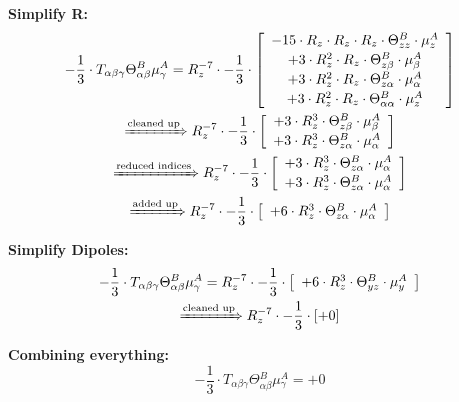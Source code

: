 \documentclass{article}
\begin{document}
\textbf{Simplify R:}
\begin{subequations}\begin{gather}
- \frac{1}{3} \cdot T_{\alpha{}\beta{}\gamma{}} \Theta{}^{B}_{\alpha{}\beta{}} \mu{}^{A}_{\gamma{}} = R_{z}^{-7} \cdot - \frac{1}{3} \cdot  \left[ \begin{array}{c} 
 		- 15 \cdot R_{z} \cdot R_{z} \cdot R_{z} \cdot \Theta{}^{B}_{zz} \cdot \mu{}^{A}_{z} 
 \\[0.2em] 		 + 3 \cdot R_{z}^{2} \cdot R_{z} \cdot \Theta{}^{B}_{z\beta{}} \cdot \mu{}^{A}_{\beta{}} 
 \\[0.2em] 		 + 3 \cdot R_{z}^{2} \cdot R_{z} \cdot \Theta{}^{B}_{z\alpha{}} \cdot \mu{}^{A}_{\alpha{}} 
 \\[0.2em] 		 + 3 \cdot R_{z}^{2} \cdot R_{z} \cdot \Theta{}^{B}_{\alpha{}\alpha{}} \cdot \mu{}^{A}_{z}
 \end{array}\right] 
\\ \xRightarrow{\text{cleaned up}}
 R_{z}^{-7} \cdot - \frac{1}{3} \cdot  \left[ \begin{array}{c} 
 		+ 3 \cdot R_{z}^{3} \cdot \Theta{}^{B}_{z\beta{}} \cdot \mu{}^{A}_{\beta{}} 
 \\[0.2em] 		 + 3 \cdot R_{z}^{3} \cdot \Theta{}^{B}_{z\alpha{}} \cdot \mu{}^{A}_{\alpha{}}
 \end{array}\right] 
\\ \xRightarrow{\text{reduced indices}}
 R_{z}^{-7} \cdot - \frac{1}{3} \cdot  \left[ \begin{array}{c} 
 		+ 3 \cdot R_{z}^{3} \cdot \Theta{}^{B}_{z\alpha{}} \cdot \mu{}^{A}_{\alpha{}} 
 \\[0.2em] 		 + 3 \cdot R_{z}^{3} \cdot \Theta{}^{B}_{z\alpha{}} \cdot \mu{}^{A}_{\alpha{}}
 \end{array}\right] 
\\ \xRightarrow{\text{added up}}
 R_{z}^{-7} \cdot - \frac{1}{3} \cdot  \left[ \begin{array}{c} 
 		+ 6 \cdot R_{z}^{3} \cdot \Theta{}^{B}_{z\alpha{}} \cdot \mu{}^{A}_{\alpha{}}
 \end{array}\right] 
\end{gather}\end{subequations}


\textbf{Simplify Dipoles:}
\begin{subequations}\begin{gather}
- \frac{1}{3} \cdot T_{\alpha{}\beta{}\gamma{}} \Theta{}^{B}_{\alpha{}\beta{}} \mu{}^{A}_{\gamma{}} = R_{z}^{-7} \cdot - \frac{1}{3} \cdot  \left[ \begin{array}{c} 
 		+ 6 \cdot R_{z}^{3} \cdot \Theta{}^{B}_{yz} \cdot \mu{}^{A}_{y}
 \end{array}\right] 
\\ \xRightarrow{\text{cleaned up}}
 R_{z}^{-7} \cdot - \frac{1}{3} \cdot \left[ + 0 \right]
\end{gather}\end{subequations}


\textbf{Combining everything:}
\begin{equation}
- \frac{1}{3} \cdot T_{\alpha{}\beta{}\gamma{}} \Theta{}^{B}_{\alpha{}\beta{}} \mu{}^{A}_{\gamma{}} = + 0
\end{equation}
\end{document}
